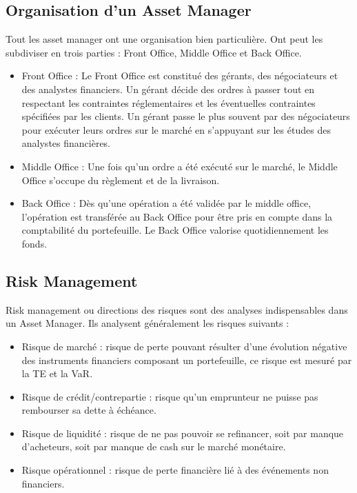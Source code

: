 \subsection{Organisation d'un Asset Manager}
\par Tout les asset manager ont une organisation bien particulière. Ont peut les subdiviser en trois parties : Front Office, Middle Office et Back Office.
\begin{itemize}
    \item Front Office : Le Front Office est constitué des gérants, des négociateurs et des analystes financiers. Un gérant décide des ordres à passer tout en respectant les contraintes réglementaires et les éventuelles contraintes spécifiées par les clients. Un gérant passe le plus souvent par des négociateurs pour exécuter leurs ordres sur le marché en s’appuyant sur les études des analystes financières.  
    \item Middle Office : Une fois qu’un ordre a été exécuté sur le marché, le Middle Office s’occupe du règlement et de la livraison.  
    \item Back Office : Dès qu’une opération a été validée par le middle office, l’opération est transférée au Back Office pour être pris en compte dans la comptabilité du portefeuille. Le Back Office valorise quotidiennement les fonds.  
\end{itemize}

\subsection{Risk Management}
Risk management ou directions des risques sont des analyses indispensables dans un Asset Manager. Ils analysent généralement les risques suivants : 
\begin{itemize}
    \item Risque de marché : risque de perte pouvant résulter d’une évolution négative des instruments financiers composant un portefeuille, ce risque est mesuré par la TE et la VaR.  
    \item Risque de crédit/contrepartie : risque qu’un emprunteur ne puisse pas rembourser sa dette à échéance.  
    \item Risque de liquidité : risque de ne pas pouvoir se refinancer, soit par manque d’acheteurs, soit par manque de cash sur le marché monétaire.  
    \item Risque opérationnel : risque de perte financière lié à des événements non financiers.
\end{itemize} 

